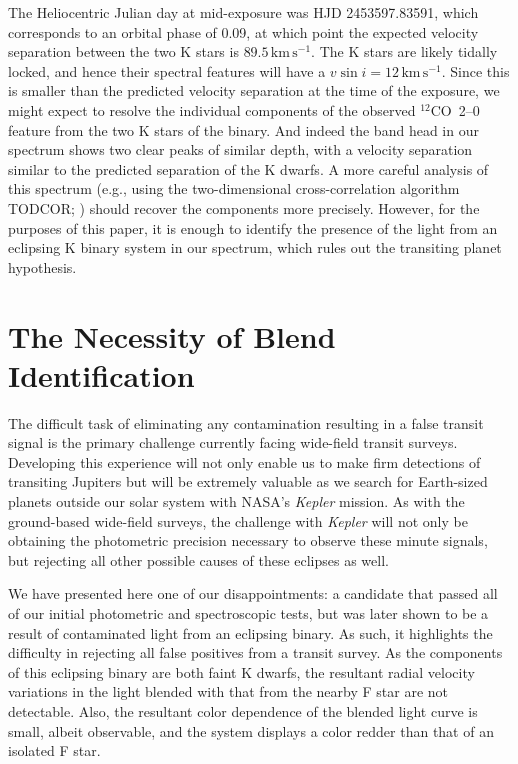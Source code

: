The Heliocentric Julian day at mid-exposure was HJD 2453597.83591,
which corresponds to an orbital phase of 0.09, at which point the
expected velocity separation between the two K stars is
$89.5\,\mathrm{km\,s^{-1}}$.  The K stars are likely tidally locked,
and hence their spectral features will have a $v \sin{i} =
12\,\mathrm{km\,s^{-1}}$. Since this is smaller than the predicted
velocity separation at the time of the exposure, we might expect to
resolve the individual components of the observed \mbox{$^{12}$CO 2--0} feature
from the two K stars of the binary. And indeed the band head in our
spectrum shows two clear peaks of similar depth, with a velocity
separation similar to the predicted separation of the K dwarfs. A more
careful analysis of this spectrum (e.g., using the two-dimensional cross-correlation algorithm TODCOR;
\citealt{Zucker_Mazeh:apj:1994a}) should recover the components more
precisely. However, for the purposes of this paper, it is enough to
identify the presence of the light from an eclipsing K binary system
in our spectrum, which rules out the transiting planet hypothesis.

\section{The Necessity of Blend Identification}
\label{cha:gsc:sec:dis}

The difficult task of eliminating any contamination resulting in a
false transit signal is the primary challenge currently facing wide-field transit surveys. Developing this experience will not only enable
us to make firm detections of transiting Jupiters but will be
extremely valuable as we search for Earth-sized planets outside our
solar system with NASA's {\it Kepler} mission. As with the
ground-based wide-field surveys, the challenge with {\it Kepler} will not
only be obtaining the photometric precision necessary to observe these
minute signals, but rejecting all other possible causes of these
eclipses as well.

We have presented here one of our disappointments: a candidate that
passed all of our initial photometric and spectroscopic tests, but was
later shown to be a result of contaminated light from an eclipsing
binary. As such, it highlights the difficulty in rejecting all false
positives from a transit survey. As the components of this eclipsing
binary are both faint K dwarfs, the resultant radial velocity
variations in the light blended with that from the nearby F star are
not detectable. Also, the resultant color dependence of the blended
light curve is small, albeit observable, and the system displays a
color redder than that of an isolated F star.

